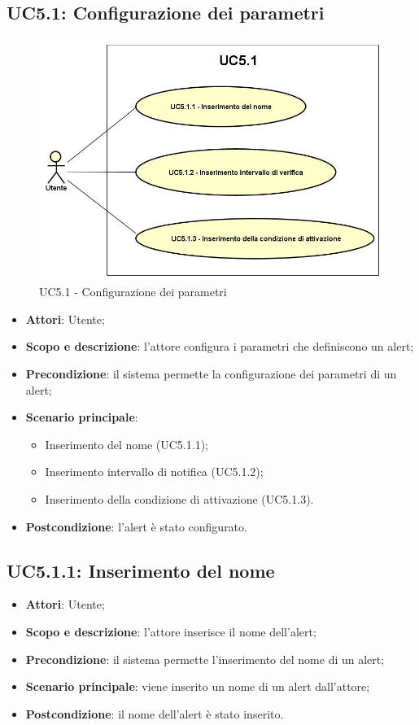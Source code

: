 \subsection{UC5.1: Configurazione dei parametri}
\hypertarget{UC5.1}{}
\begin{figure} [H]
	\centering
	\includegraphics[scale=0.45]{Img/UC5-1}
	\caption{UC5.1 - Configurazione dei parametri}\label{}
\end{figure}
\begin{itemize}
	\item \textbf{Attori}: Utente;
	\item \textbf{Scopo e descrizione}: l'attore configura i parametri che definiscono un alert;
	\item \textbf{Precondizione}: il sistema permette la configurazione dei parametri di un alert;
	\item \textbf{Scenario principale}:
	\begin{itemize}
		\item Inserimento del nome (UC5.1.1);
		\item Inserimento intervallo di notifica (UC5.1.2);
		\item Inserimento della condizione di attivazione (UC5.1.3).
	\end{itemize}
	\item \textbf{Postcondizione}: l'alert è stato configurato.
\end{itemize}

\subsection{UC5.1.1: Inserimento del nome}
\hypertarget{UC5.1.1}{}
\begin{itemize}
	\item \textbf{Attori}: Utente;
	\item \textbf{Scopo e descrizione}: l'attore inserisce il nome dell'alert;
	\item \textbf{Precondizione}: il sistema permette l'inserimento del nome di un alert;
	\item \textbf{Scenario principale}: viene inserito un nome di un alert dall'attore;
	\item \textbf{Postcondizione}: il nome dell'alert è stato inserito.
\end{itemize}

